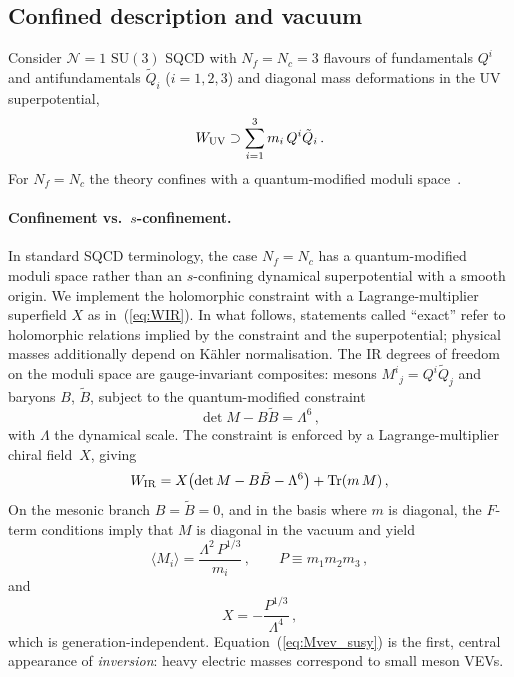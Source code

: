 \documentclass[11pt,a4paper]{article}
\newcommand{\SU}{\mathrm{SU}}
\newcommand{\Nf}{N_f}
\newcommand{\Nc}{N_c}
\newcommand{\Tr}{\mathrm{Tr}}
\begin{document}
\subsection{Confined description and vacuum}
\label{sec:confined}

Consider $\mathcal{N}{=}1$ $\SU(3)$ SQCD with $\Nf=\Nc=3$ flavours of
fundamentals $Q^i$ and antifundamentals $\tilde Q_i$ ($i=1,2,3$) and
diagonal mass deformations in the UV superpotential,
\begin{equation}
  W_{\rm UV}\supset \sum_{i=1}^3 m_i\,Q^i\tilde Q_i\,.
  \label{eq:WUV_mass}
\end{equation}
For $\Nf=\Nc$ the theory confines with a quantum-modified moduli space~\cite{Seiberg:1994bz,Csaki:1996zb,IntriligatorSeibergShenker:1995}.
\paragraph{Confinement vs.\ $s$-confinement.}
In standard SQCD terminology, the case $\Nf=\Nc$ has a quantum-modified moduli
space rather than an $s$-confining dynamical superpotential with a smooth
origin.  We implement the holomorphic constraint with a Lagrange-multiplier
superfield $X$ as in~(\ref{eq:WIR}).  In what follows, statements called
``exact'' refer to holomorphic relations implied by the constraint and the
superpotential; physical masses additionally depend on K\"ahler normalisation.
The IR degrees of freedom on the moduli space are gauge-invariant composites:
mesons $M^i{}_j=Q^i\tilde Q_j$ and baryons $B$, $\tilde B$, subject to the
quantum-modified constraint
\begin{equation}
  \det M - B\tilde B = \Lambda^6\,,
  \label{eq:qmc}
\end{equation}
with $\Lambda$ the dynamical scale.
The constraint is enforced by a Lagrange-multiplier chiral field~$X$, giving
\begin{equation}
  W_{\rm IR}
  = X\bigl(\det M - B\tilde B - \Lambda^6\bigr) + \Tr(m\,M)\,,
  \label{eq:WIR}
\end{equation}
On the mesonic branch $B=\tilde B=0$, and in the basis where $m$ is diagonal,
the $F$-term conditions imply that $M$ is diagonal in the vacuum and yield
\begin{equation}
  \langle M_i\rangle = \frac{\Lambda^2\,P^{1/3}}{m_i}\,,
  \qquad
  P\equiv m_1m_2m_3\,,
  \label{eq:Mvev_susy}
\end{equation}
and
\begin{equation}
  X=-\frac{P^{1/3}}{\Lambda^4}\,,
  \label{eq:Xvev}
\end{equation}
which is generation-independent.
Equation~(\ref{eq:Mvev_susy}) is the first, central appearance of
\emph{inversion}: heavy electric masses correspond to small meson VEVs.
\end{document}
